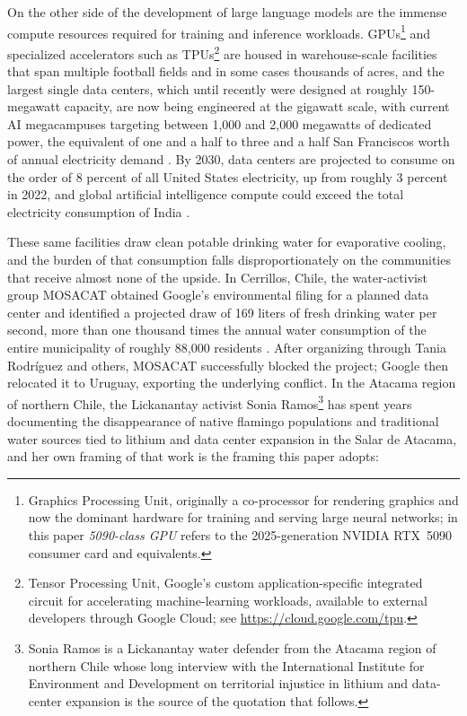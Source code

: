 \documentclass[10pt,a4paper,twocolumn]{article}
\begin{document}
On the other side of the development of large language models are the immense compute resources required for training and inference workloads. GPUs\footnote{Graphics Processing Unit, originally a co-processor for rendering graphics and now the dominant hardware for training and serving large neural networks; in this paper \emph{5090-class GPU} refers to the 2025-generation NVIDIA RTX~5090 consumer card and equivalents.} and specialized accelerators such as TPUs\footnote{Tensor Processing Unit, Google's custom application-specific integrated circuit for accelerating machine-learning workloads, available to external developers through Google Cloud; see \url{https://cloud.google.com/tpu}.} are housed in warehouse-scale facilities that span multiple football fields and in some cases thousands of acres, and the largest single data centers, which until recently were designed at roughly 150-megawatt capacity, are now being engineered at the gigawatt scale, with current AI megacampuses targeting between 1{,}000 and 2{,}000 megawatts of dedicated power, the equivalent of one and a half to three and a half San Franciscos worth of annual electricity demand \citep[ch.~12]{hao2025empire}. By 2030, data centers are projected to consume on the order of 8 percent of all United States electricity, up from roughly 3 percent in 2022, and global artificial intelligence compute could exceed the total electricity consumption of India \citep[ch.~12]{hao2025empire,strubell2019energy}.

These same facilities draw clean potable drinking water for evaporative cooling, and the burden of that consumption falls disproportionately on the communities that receive almost none of the upside. In Cerrillos, Chile, the water-activist group MOSACAT obtained Google's environmental filing for a planned data center and identified a projected draw of 169 liters of fresh drinking water per second, more than one thousand times the annual water consumption of the entire municipality of roughly 88{,}000 residents \citep[ch.~12]{hao2025empire}. After organizing through Tania Rodr\'iguez and others, MOSACAT successfully blocked the project; Google then relocated it to Uruguay, exporting the underlying conflict. In the Atacama region of northern Chile, the Lickanantay activist Sonia Ramos\footnote{Sonia Ramos is a Lickanantay water defender from the Atacama region of northern Chile whose long interview with the International Institute for Environment and Development on territorial injustice in lithium and data-center expansion is the source of the quotation that follows.} has spent years documenting the disappearance of native flamingo populations and traditional water sources tied to lithium and data center expansion in the Salar de Atacama, and her own framing of that work is the framing this paper adopts:
\end{document}

